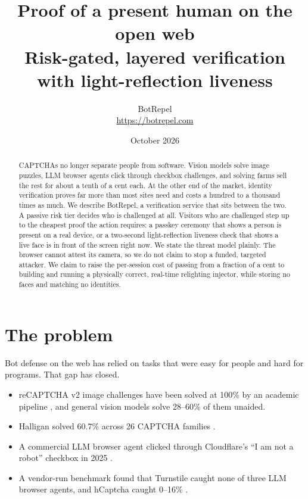 \documentclass[11pt]{article}
\title{\textbf{Proof of a present human on the open web}\\[4pt]
  \large Risk-gated, layered verification with light-reflection liveness}
\author{BotRepel\\\small\url{https://botrepel.com}}
\date{October 2026}
\begin{document}
\maketitle

\begin{abstract}
CAPTCHAs no longer separate people from software. Vision models solve image puzzles, LLM browser
agents click through checkbox challenges, and solving farms sell the rest for about a tenth of a
cent each. At the other end of the market, identity verification proves far more than most sites
need and costs a hundred to a thousand times as much. We describe BotRepel, a verification
service that sits between the two. A passive risk tier decides who is challenged at all. Visitors
who are challenged step up to the cheapest proof the action requires: a passkey ceremony that
shows a person is present on a real device, or a two-second light-reflection liveness check that
shows a live face is in front of the screen right now. We state the threat model plainly. The
browser cannot attest its camera, so we do not claim to stop a funded, targeted attacker. We
claim to raise the per-session cost of passing from a fraction of a cent to building and running
a physically correct, real-time relighting injector, while storing no faces and matching no
identities.
\end{abstract}

\section{The problem}

Bot defense on the web has relied on tasks that were easy for people and hard for programs.
That gap has closed.

\begin{itemize}
  \item reCAPTCHA v2 image challenges have been solved at 100\% by an academic pipeline
        \cite{eth-recaptcha}, and general vision models solve 28--60\% of them unaided.
  \item Halligan solved 60.7\% across 26 CAPTCHA families \cite{halligan}.
  \item A commercial LLM browser agent clicked through Cloudflare's ``I am not a robot''
        checkbox in 2025 \cite{chatgpt-agent}.
  \item A vendor-run benchmark found that Turnstile caught none of three LLM browser agents,
        and hCaptcha caught 0--16\% \cite{poh-benchmark}.
\end{itemize}
\end{document}
